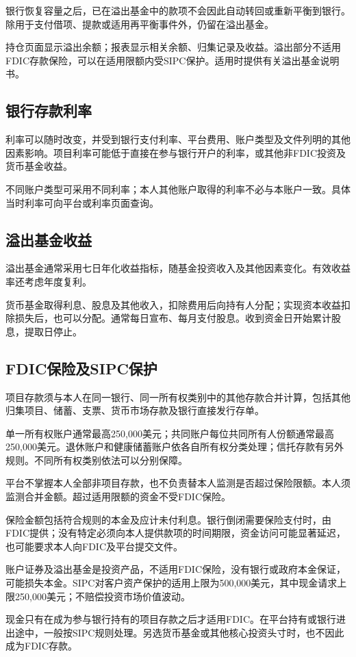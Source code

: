 \documentclass[UTF8,fontset=none,11pt,a4paper]{ctexart}
\begin{document}
银行恢复容量之后，已在溢出基金中的款项不会因此自动转回或重新平衡到银行。除用于支付借项、提款或适用再平衡事件外，仍留在溢出基金。


持仓页面显示溢出余额；报表显示相关余额、归集记录及收益。溢出部分不适用FDIC存款保险，可以在适用限额内受SIPC保护。适用时提供有关溢出基金说明书。


\subsection*{银行存款利率}
利率可以随时改变，并受到银行支付利率、平台费用、账户类型及文件列明的其他因素影响。项目利率可能低于直接在参与银行开户的利率，或其他非FDIC投资及货币基金收益。


不同账户类型可采用不同利率；本人其他账户取得的利率不必与本账户一致。具体当时利率可向平台或利率页面查询。


\subsection*{溢出基金收益}
溢出基金通常采用七日年化收益指标，随基金投资收入及其他因素变化。有效收益率还考虑年度复利。


货币基金取得利息、股息及其他收入，扣除费用后向持有人分配；实现资本收益扣除损失后，也可以分配。通常每日宣布、每月支付股息。收到资金日开始累计股息，提取日停止。


\subsection*{FDIC保险及SIPC保护}
项目存款须与本人在同一银行、同一所有权类别中的其他存款合并计算，包括其他归集项目、储蓄、支票、货币市场存款及银行直接发行存单。


单一所有权账户通常最高250,000美元；共同账户每位共同所有人份额通常最高250,000美元。退休账户和健康储蓄账户依各自所有权分类处理；信托存款有另外规则。不同所有权类别依法可以分别保障。


平台不掌握本人全部非项目存款，也不负责替本人监测是否超过保险限额。本人须监测合并金额。超过适用限额的资金不受FDIC保险。


保险金额包括符合规则的本金及应计未付利息。银行倒闭需要保险支付时，由FDIC提供；没有特定必须向本人提供款项的时间期限，资金访问可能显著延迟，也可能要求本人向FDIC及平台提交文件。


账户证券及溢出基金是投资产品，不适用FDIC保险，没有银行或政府本金保证，可能损失本金。SIPC对客户资产保护的适用上限为500,000美元，其中现金请求上限250,000美元；不赔偿投资市场价值波动。


现金只有在成为参与银行持有的项目存款之后才适用FDIC。在平台持有或银行进出途中，一般按SIPC规则处理。另选货币基金或其他核心投资头寸时，也不因此成为FDIC存款。
\end{document}
